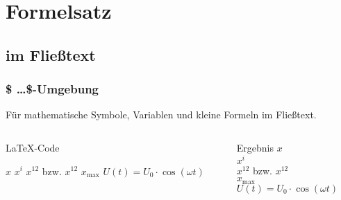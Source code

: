 \section{Formelsatz}
\subsection{im Fließtext}
\begin{frame}[fragile]
   \frametitle{\$ \dots \$-Umgebung}
   Für mathematische Symbole, Variablen und kleine Formeln im Fließtext.

    \begin{columns}[T]
        \begin{column}{0.6\textwidth}
            \begin{block}{\LaTeX-Code}
                \begin{lstverbatim}
                $x$
                $x^i$
                $x^12$ bzw. $x^{12}$ %
                $x_\mathrm{max}$
                $U(t) = U_0 \cdot \cos(\omega t)$
                \end{lstverbatim}
            \end{block}
        \end{column}
        \begin{column}{0.35\textwidth}
            \begin{block}{Ergebnis}
                $x$  \\
                $x^i$ \\
                $x^12$ bzw. $x^{12}$ \\
                $x_\mathrm{max}$ \\
                $U(t) = U_0 \cdot \cos(\omega t)$
            \end{block}
        \end{column}
    \end{columns}
\end{frame}
